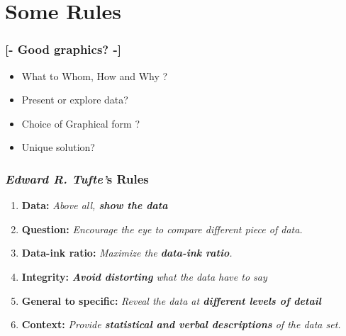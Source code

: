 \documentclass[xcolor=x11names,compress, aspectratio=169]{beamer}
\renewcommand{\(}{\begin{columns}}
\renewcommand{\)}{\end{columns}}
\newcommand{\<}[1]{\begin{column}{#1}}
\renewcommand{\>}{\end{column}}
\begin{document}
\section{Some Rules}


\begin{frame} %
\frametitle{\textcolor{brique}{[- Good graphics? -]}}
 \begin{itemize}
    \item<+->  What to Whom, How and Why ? \\
    \item<+->  Present or explore data?\\
    \item<+-> Choice of Graphical form ?\\
    \item<+-> Unique solution? \\
 \end{itemize}
\end{frame}

%


\begin{frame} %
\frametitle{\textcolor{brique}{\textit{Edward R. Tufte'}s Rules}}
    \begin{enumerate}
       \item<+->[] \textbf{Data:} \emph{Above all, \textbf{show the data}}
       \item<+->[]\textbf{Question:} \emph{ Encourage the eye to compare different piece of data.}
       \item<+->[]\textbf{Data-ink ratio:} \emph{Maximize the \textbf{data-ink ratio}.}
       \item<+->[]\textbf{Integrity:} \emph{\textbf{Avoid distorting} what the data have to say}
      \item<+->[]\textbf{General to specific:} \emph{Reveal the data at \textbf{different levels of detail}}
      \item<+->[]\textbf{Context:}  \emph{Provide \textbf{statistical and verbal descriptions} of the data set.}
    \end{enumerate}
\end{frame}
\end{document}
